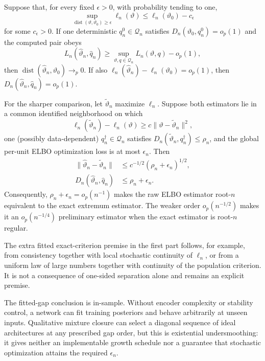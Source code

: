 \begin{theorem}
\label{thm:one_comparator}
Suppose that, for every fixed $\epsilon>0$, with probability tending to one,
\[
 \sup_{\operatorname{dist}(\vartheta,\vartheta_0)\geq\epsilon}
 \ell_n(\vartheta)
 \leq \ell_n(\vartheta_0)-c_\epsilon
\]
for some $c_\epsilon>0$.  If one deterministic $q_n^0\in\mathcal Q_n$
satisfies $D_n(\vartheta_0,q_n^0)=o_p(1)$ and the computed pair obeys
\[
 L_n(\widehat\vartheta_n,\widehat q_n)
 \geq\sup_{\vartheta,q\in\mathcal Q_n}L_n(\vartheta,q)-o_p(1),
\]
then $\operatorname{dist}(\widehat\vartheta_n,\vartheta_0)\to_p0$.  If also
$\ell_n(\widehat\vartheta_n)-\ell_n(\vartheta_0)=o_p(1)$, then
$D_n(\widehat\vartheta_n,\widehat q_n)=o_p(1)$.

For the sharper comparison, let $\widetilde\vartheta_n$ maximize $\ell_n$.
Suppose both estimators lie in a common identified neighborhood on which
\begin{equation}
 \ell_n(\widetilde\vartheta_n)-\ell_n(\vartheta)
 \geq c\|\vartheta-\widetilde\vartheta_n\|^2,
 \label{eq:exact_local_quadratic_separation}
\end{equation}
one (possibly data-dependent) $q_n^\dagger\in\mathcal Q_n$ satisfies
$D_n(\widetilde\vartheta_n,q_n^\dagger)\leq\rho_n$, and the global per-unit
ELBO optimization loss is at most $\epsilon_n$.  Then
\begin{align}
 \|\widehat\vartheta_n-\widetilde\vartheta_n\|
 &\leq c^{-1/2}(\rho_n+\epsilon_n)^{1/2},
 \label{eq:aggressive_parameter_comparison}\\
 D_n(\widehat\vartheta_n,\widehat q_n)
 &\leq\rho_n+\epsilon_n.
 \label{eq:aggressive_fitted_gap}
\end{align}
Consequently, $\rho_n+\epsilon_n=o_p(n^{-1})$ makes the raw ELBO estimator
root-$n$ equivalent to the exact extremum estimator.  The weaker order
$o_p(n^{-1/2})$ makes it an $o_p(n^{-1/4})$ preliminary estimator when the
exact estimator is root-$n$ regular.
\end{theorem}

The extra fitted exact-criterion premise in the first part follows, for
example, from consistency together with local stochastic continuity of
$\ell_n$, or from a uniform law of large numbers together with continuity of
the population criterion.  It is not a consequence of one-sided separation
alone and remains an explicit premise.

The fitted-gap conclusion is in-sample.  Without encoder complexity or
stability control, a network can fit training posteriors and behave
arbitrarily at unseen inputs.  Qualitative mixture closure can select a
diagonal sequence of ideal architectures at any prescribed gap order, but
this is existential undersmoothing: it gives neither an implementable growth
schedule nor a guarantee that stochastic optimization attains the required
$\epsilon_n$.

